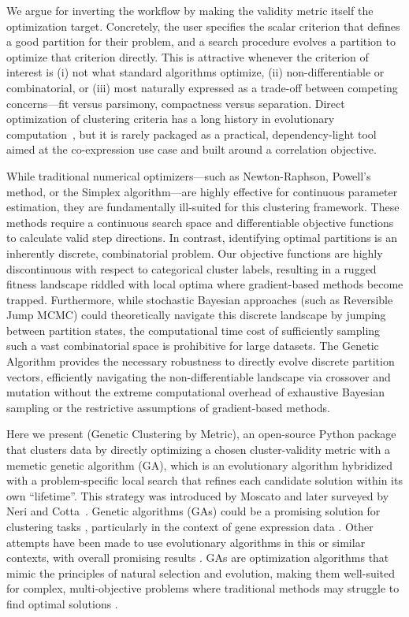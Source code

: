 We argue for inverting the workflow by making the validity metric itself the
optimization target. Concretely, the user specifies the scalar criterion that
defines a good partition for their problem, and a search procedure evolves a
partition to optimize that criterion directly. This is attractive whenever the
criterion of interest is (i) not what standard algorithms optimize, (ii)
non-differentiable or combinatorial, or (iii) most naturally expressed as a
trade-off between competing concerns---fit versus parsimony, compactness versus
separation. Direct optimization of clustering criteria has a long history in
evolutionary computation~\cite{Maulik2000,Handl2007}, but it is rarely packaged
as a practical, dependency-light tool aimed at the co-expression use case and
built around a correlation objective.

While traditional numerical optimizers---such as Newton-Raphson, Powell's method, or the Simplex 
algorithm---are highly effective for continuous parameter estimation, they are fundamentally 
ill-suited for this clustering framework. These methods require a continuous search space and 
differentiable objective functions to calculate valid step directions. In contrast, identifying 
optimal partitions is an inherently discrete, combinatorial problem. Our objective functions are 
highly discontinuous with respect to categorical cluster labels, resulting in a rugged fitness 
landscape riddled with local optima where gradient-based methods become trapped. Furthermore, 
while stochastic Bayesian approaches (such as Reversible Jump MCMC) could theoretically navigate
 this discrete landscape by jumping between partition states, the computational time cost of 
 sufficiently sampling such a vast combinatorial space is prohibitive for large datasets. 
 The Genetic Algorithm provides the necessary robustness to directly evolve discrete partition 
 vectors, efficiently navigating the non-differentiable landscape via crossover and mutation without 
 the extreme computational overhead of exhaustive Bayesian sampling or the restrictive assumptions 
 of gradient-based methods.

Here we present \tool{} (Genetic Clustering by Metric), an open-source Python package that clusters data by directly optimizing a chosen cluster-validity metric with a memetic genetic algorithm (GA), which is an evolutionary algorithm hybridized with a problem-specific local search that refines each candidate solution within its own ``lifetime''. This strategy was introduced by Moscato and later surveyed by Neri and Cotta~\cite{Moscato1989,NeriCotta2012}. Genetic algorithms (GAs) could be a promising solution for clustering tasks \cite{katoch2021}, particularly in the context of gene expression data \cite{pirim2012}. Other attempts have been made to use evolutionary algorithms in this or similar contexts, with overall promising results \cite{hageman2008, hruschka2006, korkmaz2006, weiEntropyClusteringAnalysis2008}. GAs are optimization algorithms that mimic the principles of natural selection and evolution, making them well-suited for complex, multi-objective problems where traditional methods may struggle to find optimal solutions \cite{wirsanskyHGA2020}. 

